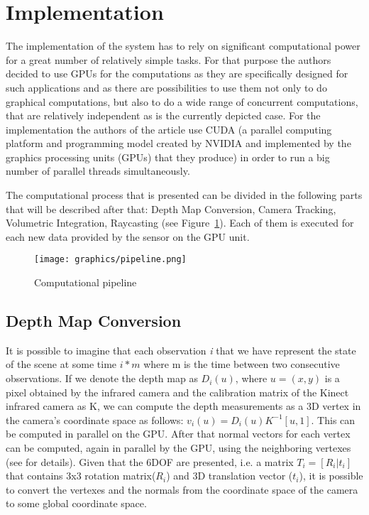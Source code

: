 \documentclass[12pt]{article}
\theoremstyle{plain}
\begin{document}
\section{Implementation} %
\label{sec:Implementation}
  The implementation of the system has to rely on significant computational
  power for a great number of relatively simple tasks. For that purpose the
  authors decided to use GPUs for the computations as they are specifically
  designed for such applications and as there are possibilities to use them not
  only to do graphical computations, but also to do a wide range of concurrent
  computations, that are relatively independent as is the currently depicted
  case. For the implementation the authors of the article use CUDA (a parallel
  computing platform and programming model created by NVIDIA and implemented by
  the graphics processing units (GPUs) that they produce) in order to run a big
  number of parallel threads simultaneously. 

  The computational process that is presented can be divided in the following
  parts that will be described after that: Depth Map Conversion, Camera
  Tracking, Volumetric Integration, Raycasting (see Figure~\ref{fig:pipeline}).
  Each of them is executed for each new data provided by the sensor on the GPU
  unit.

  \begin{figure}[h]
    \centering
    \caption{Computational pipeline}
    \texttt{[image: graphics/pipeline.png]}
    \label{fig:pipeline}
  \end{figure}

  \subsection{Depth Map Conversion} %
  \label{sub:Depth Map Conversion}
    It is possible to imagine that each observation \emph{i} that we have
    represent the state of the scene at some time $i * m$ where m is the time
    between two consecutive observations. If we denote the depth map as
    $D_i(u)$, where $u = (x, y)$ is a pixel obtained by the infrared camera and
    the calibration matrix of the Kinect infrared camera as K, we can compute
    the depth measurements as a 3D vertex in the camera's coordinate space as
    follows: $v_i(u) = D_i(u) K ^ {-1}[u, 1]$. This can be computed in parallel
    on the GPU. After that normal vectors for each vertex can be computed, again
    in parallel by the GPU, using the neighboring vertexes (see
    \cite{kinectfusion} for details).
    Given that the 6DOF are presented, i.e. a matrix $T_i = [R_i|t_i]$ that
    contains 3x3 rotation matrix($R_i$) and 3D translation vector ($t_i$), it is
    possible to convert the vertexes and the normals from the coordinate space
    of the camera to some global coordinate space.
\end{document}
